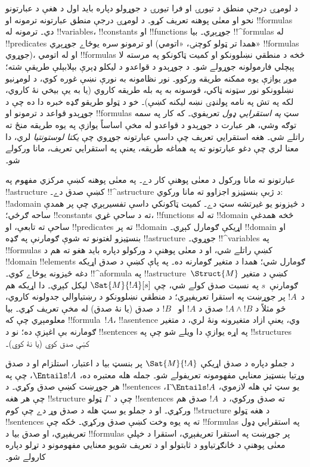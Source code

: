 \documentclass[../../../include/open-logic-section]{subfiles}
\begin{document}


د لومړۍ درجې منطق د تيورۍ او فرا تيورۍ د جوړولو دپاره بايد اول د هغې د عبارتونو نحو او معنٰی پوهنه تعريف کړو۔ د لومړۍ درجې منطق عبارتونه ترمونه او !!{formula}s دي۔ ترمونه له !!{variable}s، !!{constant}s او !!{function}s جوړېږي۔ بيا !!^{formula}s له !!{predicate}s او ترمونو سره يوځاے جوړېږي (همدا تر ټولو کوچنۍ، «اتومي» !!{formula}s جوړوي)، او له اتومي !!{formula}s څخه د منطقي نښلوونکو او کمیت ټاکونکو په مرسته لا پېچلي فارمولونه جوړولے شو۔ د جوړېدو د قواعدو د ليکلو ډېرې بېلابېلې طريقې شته؛ موږ يوازې يوه ممکنه طريقه ورکوو۔ نور نظامونه به نورې نښې غوره کوي، د لومړنيو نښلوونکو نور سټونه ټاکي، قوسونه به په بله طريقه کاروي (يا به يې بيخي نۀ کاروي، لکه په تش په نامه پولنډۍ نښه ليکنه کښې)۔ خو د ټولو طريقو ګډه خبره دا ده چې د جوړېدو قواعد د ترمونو او !!{formula}s سټ \emph{په استقرايي ډول} تعريفوي۔ که کار په سمه توګه وشي، هر عبارت د جوړېدو د قواعدو له مخې اساساً يوازې په يوه طريقه منځ ته راتلے شي۔ هغه استقرايي تعريف چې داسې عبارتونه جوړوي چې \emph{يکتا لوستونتيا} لري، دا معنا لري چې دغو عبارتونو ته په هماغه طريقه، يعنې په استقرايي تعريف، مانا ورکولے شو۔

عبارتونو ته مانا ورکول د معنٰی پوهنې کار دے۔ په معنٰی پوهنه کښې مرکزي مفهوم په !!a{structure} کښې صدق دے۔ !!^a{structure} د ژبې بنسټيزو اجزاوو ته مانا ورکوي: !!a{domain} د څيزونو يو غيرتشه سټ دے۔ کمیت ټاکونکي داسې تفسيرېږي چې پر همدې ساحه ګرځي؛ !!{constant}s ته د ساحې غړي، !!{function}s ته له !!{domain} څخه همدغې ساحې ته تابعې، او !!{predicate}s ته پر !!{domain} اړيکې ګومارل کېږي۔ !!{domain} او بنسټيزو لغتونو ته شوې ګومارنې په ګډه !!a{structure} جوړوي۔ !!^{variable}s په !!{formula}s کښې راتلے شي، او د معنٰی پوهنې د ورکولو دپاره بايد هغو ته هم د !!{domain} !!{element}s ګومارل شي؛ همدا د متغير ګومارنه ده۔ په پاې کښې د صدق اړيکه دغه څيزونه يوځاے کوي۔ !!^a{formula} په !!a{structure}~$\Struct{M}$ کښې د متغير ګومارنې~$s$ په نسبت صدق کولے شي، چې $\Sat{M}{!A}[s]$ ليکل کېږي۔ دا اړيکه هم د~$!A$ پر جوړښت په استقرا تعريفېږي؛ د منطقي نښلوونکو د رښتياوالي جدولونه کاروي، څو مثلاً د $!A \land !B$ صدق د $!A$ او ~$!B$ د صدق (يا نۀ صدق) له مخې تعريف کړي۔ بيا معلومېږي چې که !!{formula}~$!A$، !!a{sentence} وي، يعنې ازاد متغيرونه ونۀ لري، د متغير ګومارنه بې اغېزې ده؛ نو د !!{sentence}s په اړه يوازې دا ويلے شو چې په !!{structure}s کښې صدق کوي (يا نۀ کوي)۔

د جملو دپاره د صدق اړيکې $\Sat{M}{!A}$ پر بنسټ بيا د اعتبار، استلزام او د صدق وړتيا بنسټيز معنايي مفهومونه تعريفولے شو۔ جمله هله معتبره ده، $\Entails !A$، چې په هر جوړښت کښې صدق وکړي۔ د !!{sentence}s يو سټ ئې هله لازموي، $\Gamma \Entails !A$، چې هر هغه !!{structure} چې د~$\Gamma$ ټولو !!{sentence}s ته صدق ورکوي، د~$!A$ صدق هم ورکړي۔ او د جملو يو سټ هله د صدق وړ دے چې کوم !!{structure} د هغه ټولو !!{sentence}s ته په يوه وخت کښې صدق ورکړي۔ ځکه چې !!{formula}s په استقرايي ډول تعريفېږي، او صدق بيا د !!{formula}s پر جوړښت په استقرا تعريفېږي، استقرا د خپلې معنٰی پوهنې د ځانګړتياوو د ثابتولو او د تعريف شويو معنايي مفهومونو د تړلو دپاره کارولے شو۔
\end{document}
